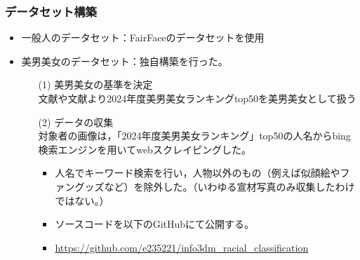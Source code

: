 \documentclass[a4paper,11pt,titlepage]{jsarticle}
\begin{document}
\subsubsection{データセット構築}
\begin{itemize}
    \item 一般人のデータセット：FairFaceのデータセットを使用
    \item 美男美女のデータセット：独自構築を行った。
        \begin{itemize}
            \item[(1)] 美男美女の基準を決定 \\
                文献\cite{bidanshi}や文献\cite{bijoshi}より2024年度美男美女ランキングtop50を美男美女として扱う
            \item[(2)] データの収集 \\
                対象者の画像は，「2024年度美男美女ランキング」top50の人名からbing検索エンジンを用いてwebスクレイピングした。
                \begin{itemize}
                	\item	人名でキーワード検索を行い，人物以外のもの（例えば似顔絵やファングッズなど）を除外した。（いわゆる宣材写真のみ収集したわけではない。）
                    \item ソースコードを以下のGitHubにて公開する。
                    \item \url{https://github.com/e235221/info3dm_racial_classification}
                \end{itemize}
        \end{itemize}
\end{itemize}
    
\end{document}
